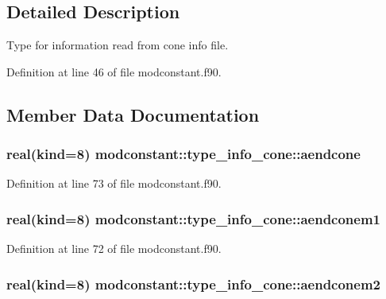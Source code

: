 \subsection{Detailed Description}
Type for information read from cone info file. 

Definition at line 46 of file modconstant.\-f90.



\subsection{Member Data Documentation}
\hypertarget{structmodconstant_1_1type__info__cone_a34737eebed2abc15b9872c43845bbbfa}{
\subsubsection[{aendcone}]{\setlength{\rightskip}{0pt plus 5cm}real(kind=8) modconstant\-::type\-\_\-info\-\_\-cone\-::aendcone}}\label{structmodconstant_1_1type__info__cone_a34737eebed2abc15b9872c43845bbbfa}


Definition at line 73 of file modconstant.\-f90.

\hypertarget{structmodconstant_1_1type__info__cone_a6b73ea139e065620a554273986678f19}{
\subsubsection[{aendconem1}]{\setlength{\rightskip}{0pt plus 5cm}real(kind=8) modconstant\-::type\-\_\-info\-\_\-cone\-::aendconem1}}\label{structmodconstant_1_1type__info__cone_a6b73ea139e065620a554273986678f19}


Definition at line 72 of file modconstant.\-f90.

\hypertarget{structmodconstant_1_1type__info__cone_ac6ece9b57cbfb2eddeb64934f40d6e43}{
\subsubsection[{aendconem2}]{\setlength{\rightskip}{0pt plus 5cm}real(kind=8) modconstant\-::type\-\_\-info\-\_\-cone\-::aendconem2}}\label{structmodconstant_1_1type__info__cone_ac6ece9b57cbfb2eddeb64934f40d6e43}


